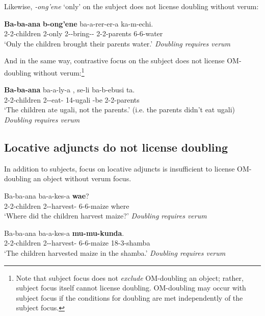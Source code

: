 \documentclass[output=paper]{langscibook}
\begin{document}
\noindent Likewise, \textit{-ong’ene} `only’ on the subject does not license doubling without verum:

\ea 
\gll \textbf{Ba-ba-ana} \textbf{b-ong’ene} ba-a-rer-er-a  ka-m-echi. \\
2-2-children 2-only 2\Sm-\Om-bring-\Appl-\Fv{} 2-2-parents	6-6-water \\
\glt `Only the children brought their parents water.’ \textit{Doubling requires verum}
\z 

\noindent And in the same way, contrastive focus on the subject does not license OM-doubling without verum:\footnote{Note that subject focus does not \textit{exclude} OM-doubling an object; rather, subject focus itself cannot license doubling. OM-doubling may occur with subject focus if the conditions for doubling are met independently of the subject focus.} 

\ea 
\gll \textbf{Ba-ba-ana} ba-a-ly-a , se-li ba-b-ebusi ta. \\
2-2-children	2\Sm-\Om-eat-\Fv{} 14-ugali \Neg-be 2-2-parents \Neg{} \\
\glt `The children ate ugali, not the parents.' (i.e. the parents didn’t eat ugali) \textit{Doubling requires verum}
\z 


\subsection{Locative adjuncts do not license doubling}

In addition to subjects, focus on locative adjuncts is insufficient to license OM-doubling an object without verum focus. 

\ea 
\begin{xlist}

\gll Ba-ba-ana ba-a-kes-a  \textbf{wae}? \\
2-2-children 2\Sm-\Om-harvest-\Fv{} 6-6-maize where \\
\glt `Where did the children harvest maize?' \textit{Doubling requires verum}

\gll Ba-ba-ana ba-a-kes-a  \textbf{mu-mu-kunda}. \\
2-2-children 2\Sm-\Om-harvest-\Fv{} 6-6-maize 18-3-shamba \\
\glt `The children harvested maize in the shamba.' \textit{Doubling requires verum}


\end{xlist}
\z
\end{document}
